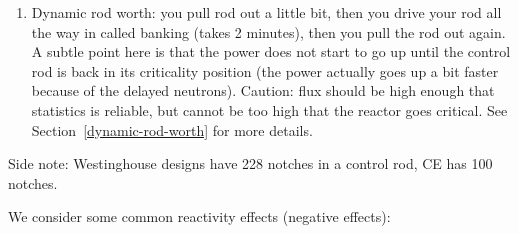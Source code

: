 \documentclass{school-22.211-notes}
\begin{document}
\begin{enumerate}
\item Dynamic rod worth:  you pull rod out a little bit, then you drive your rod all the way in called banking (takes 2 minutes), then you pull the rod out again.  A subtle point here is that the power does not start to go up until the control rod is back in its criticality position (the power actually goes up a bit faster because of the delayed neutrons). Caution: flux should be high enough that statistics is reliable, but cannot be too high that the reactor goes critical.  See Section~\ref{dynamic-rod-worth} for more details. 
\end{enumerate}
Side note: Westinghouse designs have 228 notches in a control rod, CE has 100 notches. 



\clearpage
{}
We consider some common reactivity effects (negative effects): 
\end{document}
